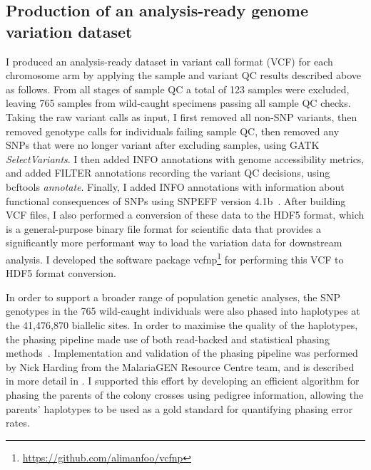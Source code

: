 \begin{refsection}
\subsection{Production of an analysis-ready genome variation dataset}\label{subsec:production-of-an-analysis-ready-dataset}


I produced an analysis-ready dataset in variant call format (VCF) for each chromosome arm by applying the sample and variant QC results described above as follows.
%
From all stages of sample QC a total of 123 samples were excluded, leaving 765 samples from wild-caught specimens passing all sample QC checks.
%
Taking the raw variant calls as input, I first removed all non-SNP variants, then removed genotype calls for individuals failing sample QC, then removed any SNPs that were no longer variant after excluding samples, using GATK \textit{SelectVariants}.
%
I then added INFO annotations with genome accessibility metrics, and added FILTER annotations recording the variant QC decisions, using bcftools \textit{annotate}.
%
Finally, I added INFO annotations with information about functional consequences of SNPs using SNPEFF version 4.1b~\parencite{Cingolani2012}.
%
After building VCF files, I also performed a conversion of these data to the HDF5 format, which is a general-purpose binary file format for scientific data that provides a significantly more performant way to load the variation data for downstream analysis.
%
I developed the software package vcfnp\footnote{\url{https://github.com/alimanfoo/vcfnp}} for performing this VCF to HDF5 format conversion.


In order to support a broader range of population genetic analyses, the SNP genotypes in the 765 wild-caught individuals were also phased into haplotypes at the 41,476,870 biallelic sites.
%
In order to maximise the quality of the haplotypes, the phasing pipeline made use of both read-backed and statistical phasing methods~\parencite{Delaneau2013}.
%
Implementation and validation of the phasing pipeline was performed by Nick Harding from the MalariaGEN Resource Centre team, and is described in more detail in \textcite{Ag1000G2017}.
%
I supported this effort by developing an efficient algorithm for phasing the parents of the colony crosses using pedigree information, allowing the parents' haplotypes to be used as a gold standard for quantifying phasing error rates. 



\end{refsection}
